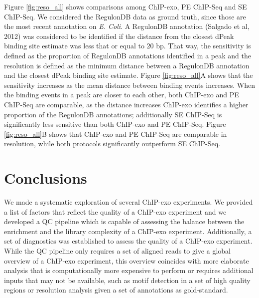 \documentclass{bmcart}\usepackage[]{graphicx}\usepackage[]{color}
\begin{document}
Figure \ref{fig:reso_all} shows comparisons among ChIP-exo, PE
ChIP-Seq and SE ChIP-Seq. We considered the RegulonDB data as ground
truth, since those are the most recent annotation on \emph{E. Coli}. A
RegulonDB annotation (Salgado et al, 2012\nocite{regulondb}) was
considered to be identified if the distance from the closest dPeak
binding site estimate was less that or equal to $20$
bp. That way, the sensitivity is defined as the proportion of
RegulonDB annotations identified in a peak and the resolution is
defined as the minimum distance between a RegulonDB annotation and the
closest dPeak binding site estimate. Figure \ref{fig:reso_all}A shows
that the sensitivity increases as the mean distance between binding
events increases. When the binding events in a peak are closer to each
other, both ChIP-exo and PE ChIP-Seq are comparable, as the distance
increases ChIP-exo identifies a higher proportion of the RegulonDB
annotations; additionally SE ChIP-Seq is significantly less sensitive
than both ChIP-exo and PE ChIP-Seq. Figure \ref{fig:reso_all}B shows
that ChIP-exo and PE ChIP-Seq are comparable in resolution, while both
protocols significantly outperform SE ChIP-Seq.


% 

\section*{Conclusions}
\label{sec:conc}

We made a systematic exploration of several ChIP-exo experiments. We
provided a list of factors that reflect the quality of a ChIP-exo
experiment and we developed a QC pipeline which is capable of
assessing the balance between the enrichment and the library
complexity of a ChIP-exo experiment. Additionally, a set of
diagnostics was established to assess the quality of a ChIP-exo
experiment. While the QC pipeline only requires a set of aligned reads
to give a global overview of a ChIP-exo experiment, this overview
coincides with more elaborate analysis that is computationally more
expensive to perform or requires additional inputs that may not be
available, such as motif detection in a set of high quality regions or
resolution analysis given a set of annotations as gold-standard.
\end{document}
